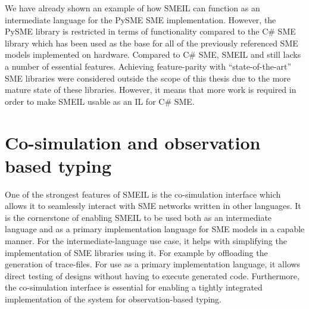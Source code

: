 We have already shown an example of how SMEIL can function as an intermediate
language for the PySME SME implementation. However, the PySME library is
restricted in terms of functionality compared to the C\# SME library which has
been used as the base for all of the previously referenced SME models
implemented on hardware. Compared to C\# SME, SMEIL and \libsme{} still lacks a
number of essential features. Achieving feature-parity with ``state-of-the-art''
SME libraries were considered outside the scope of this thesis due to the more
mature state of these libraries. However, it means that more work is required in
order to make SMEIL usable as an IL for C\# SME.




\section{Co-simulation and observation based typing}
One of the strongest features of SMEIL is the co-simulation interface which
allows it to seamlessly interact with SME networks written in other
languages. It is the cornerstone of enabling SMEIL to be used both as an
intermediate language and as a primary implementation language for SME models in
a capable manner. For the intermediate-language use case, it helps with
simplifying the implementation of SME libraries using it. For example by
offloading the generation of trace-files. For use as a primary implementation
language, it allows direct testing of designs without having to execute
generated code. Furthermore, the co-simulation interface is essential for
enabling a tightly integrated implementation of the system for observation-based
typing.


